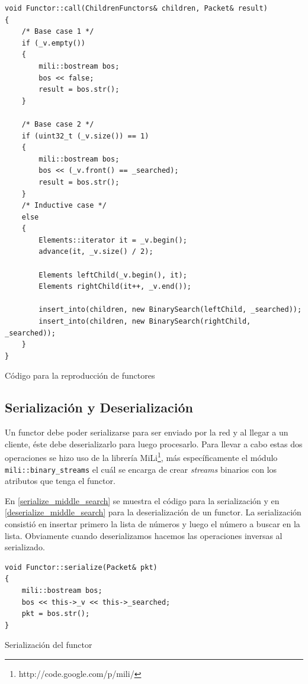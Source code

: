 \begin{table}[ht]
    \lstset{language=C++}
    \begin{lstlisting}[frame=single]
void Functor::call(ChildrenFunctors& children, Packet& result)
{
    /* Base case 1 */
    if (_v.empty())
    {
        mili::bostream bos;
        bos << false;
        result = bos.str();
    }

    /* Base case 2 */
    if (uint32_t (_v.size()) == 1)
    {
        mili::bostream bos;
        bos << (_v.front() == _searched);
        result = bos.str();
    }
    /* Inductive case */
    else
    {
        Elements::iterator it = _v.begin();
        advance(it, _v.size() / 2);

        Elements leftChild(_v.begin(), it);
        Elements rightChild(it++, _v.end());

        insert_into(children, new BinarySearch(leftChild, _searched));
        insert_into(children, new BinarySearch(rightChild, _searched));
    }
}
    \end{lstlisting}
    \centering
    \caption{Código para la reproducción de functores}
    \label{call_middle_search}
\end{table}

\subsection{Serialización y Deserialización}

Un functor debe poder serializarse para ser enviado por la red y al llegar a un cliente, éste debe deserializarlo para luego procesarlo.
Para llevar a cabo estas dos operaciones se hizo uso de la librería MiLi\footnote{http://code.google.com/p/mili/}, más específicamente el
módulo \texttt{mili::binary\_streams} el cuál se encarga de crear \textit{streams} binarios con los atributos que tenga el functor.

En \ref{serialize_middle_search} se muestra el código para la serialización  y en \ref{deserialize_middle_search} para la deserialización de
un functor. La serialización consistió en insertar primero la lista de números y luego el número a buscar en la lista. Obviamente cuando
deserializamos hacemos las operaciones inversas al serializado.

\begin{table}[ht]
    \lstset{language=C++}
    \begin{lstlisting}[frame=single]
void Functor::serialize(Packet& pkt)
{
    mili::bostream bos;
    bos << this->_v << this->_searched;
    pkt = bos.str();
}
    \end{lstlisting}
    \centering
    \caption{Serialización del functor}
    \label{serialize_middle_search}
\end{table}

